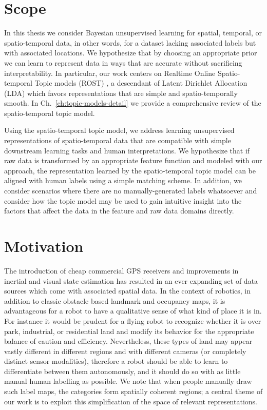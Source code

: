 \section{Scope} \label{sec:intro-scope}
In this thesis we consider Bayesian unsupervised learning for spatial, temporal, or spatio-temporal data, in other words, for a dataset lacking associated labels but with associated locations. We hypothesize that by choosing an appropriate prior we can learn to represent data in ways that are accurate without sacrificing interpretability. In particular, our work centers on Realtime Online Spatio-temporal Topic models (ROST) \citep{Girdhar2014}, a descendant of Latent Dirichlet Allocation (LDA) \citep{Blei2003} which favors representations that are simple and spatio-temporally smooth. In Ch.~\ref{ch:topic-models-detail} we provide a comprehensive review of the spatio-temporal topic model.

Using the spatio-temporal topic model, we address learning unsupervised representations of spatio-temporal data that are compatible with simple downstream learning tasks and human interpretations. We hypothesize that if raw data is transformed by an appropriate feature function and modeled with our approach, the representation learned by the spatio-temporal topic model can be aligned with human labels using a simple matching scheme. In addition, we consider scenarios where there are no manually-generated labels whatsoever and consider how the topic model may be used to gain intuitive insight into the factors that affect the data in the feature and raw data domains directly.

\section{Motivation} \label{sec:intro-motivation}
The introduction of cheap commercial GPS receivers and improvements in inertial and visual state estimation has resulted in an ever expanding set of data sources which come with associated spatial data. In the context of robotics, in addition to classic obstacle based landmark and occupancy maps, it is advantageous for a robot to have a qualitative sense of what kind of place it is in. For instance it would be prudent for a flying robot to recognize whether it is over park, industrial, or residential land and modify its behavior for the appropriate balance of caution and efficiency. Nevertheless, these types of land may appear vastly different in different regions and with different cameras (or completely distinct sensor modalities), therefore a robot should be able to learn to differentiate between them autonomously, and it should do so with as little manual human labelling as possible. We note that when people manually draw such label maps, the categories form spatially coherent regions; a central theme of our work is to exploit this simplification of the space of relevant representations.

